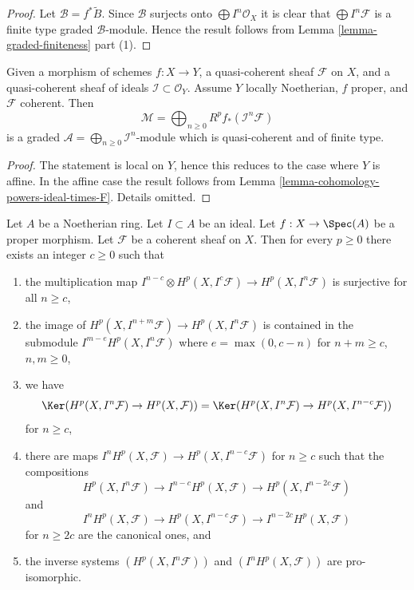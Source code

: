 \begin{proof}
Let $\mathcal{B} = f^*\widetilde{B}$. Since $\mathcal{B}$ surjects
onto $\bigoplus I^n\mathcal{O}_X$ it is clear that
$\bigoplus I^n\mathcal{F}$ is a finite type graded $\mathcal{B}$-module.
Hence the result follows from Lemma \ref{lemma-graded-finiteness} part (1).
\end{proof}

\begin{lemma}
\label{lemma-cohomology-powers-ideal-times-sheaf}
Given a morphism of schemes $f : X \to Y$, a quasi-coherent sheaf
$\mathcal{F}$ on $X$, and a quasi-coherent sheaf of ideals
$\mathcal{I} \subset \mathcal{O}_Y$. Assume $Y$ locally
Noetherian, $f$ proper, and $\mathcal{F}$ coherent.
Then
$$
\mathcal{M} =
\bigoplus\nolimits_{n \geq 0} R^pf_*(\mathcal{I}^n\mathcal{F})
$$
is a graded $\mathcal{A} = \bigoplus_{n \geq 0} \mathcal{I}^n$-module
which is quasi-coherent and of finite type.
\end{lemma}

\begin{proof}
The statement is local on $Y$, hence this reduces to the
case where $Y$ is affine. In the affine case the result follows
from Lemma \ref{lemma-cohomology-powers-ideal-times-F}.
Details omitted.
\end{proof}

\begin{lemma}
\label{lemma-cohomology-powers-ideal-application}
Let $A$ be a Noetherian ring.
Let $I \subset A$ be an ideal.
Let $f : X \to \Spec(A)$ be a proper morphism.
Let $\mathcal{F}$ be a coherent sheaf on $X$.
Then for every $p \geq 0$ there exists an integer $c \geq 0$
such that
\begin{enumerate}
\item the multiplication map
$I^{n - c} \otimes H^p(X, I^c\mathcal{F}) \to H^p(X, I^n\mathcal{F})$
is surjective for all $n \geq c$,
\item the image of $H^p(X, I^{n + m}\mathcal{F}) \to H^p(X, I^n\mathcal{F})$
is contained in the submodule $I^{m - e} H^p(X, I^n\mathcal{F})$
where $e = \max(0, c - n)$ for $n + m \geq c$, $n, m \geq 0$,
\item we have
$$
\Ker(H^p(X, I^n\mathcal{F}) \to H^p(X, \mathcal{F})) =
\Ker(H^p(X, I^n\mathcal{F}) \to H^p(X, I^{n - c}\mathcal{F}))
$$
for $n \geq c$,
\item there are maps $I^nH^p(X, \mathcal{F}) \to H^p(X, I^{n - c}\mathcal{F})$
for $n \geq c$ such that the compositions
$$
H^p(X, I^n\mathcal{F}) \to 
I^{n - c}H^p(X, \mathcal{F}) \to
H^p(X, I^{n - 2c}\mathcal{F})
$$
and
$$
I^nH^p(X, \mathcal{F}) \to
H^p(X, I^{n - c}\mathcal{F}) \to
I^{n - 2c}H^p(X, \mathcal{F})
$$
for $n \geq 2c$ are the canonical ones, and
\item the inverse systems $(H^p(X, I^n\mathcal{F}))$ and
$(I^nH^p(X, \mathcal{F}))$ are pro-isomorphic.
\end{enumerate}
\end{lemma}


